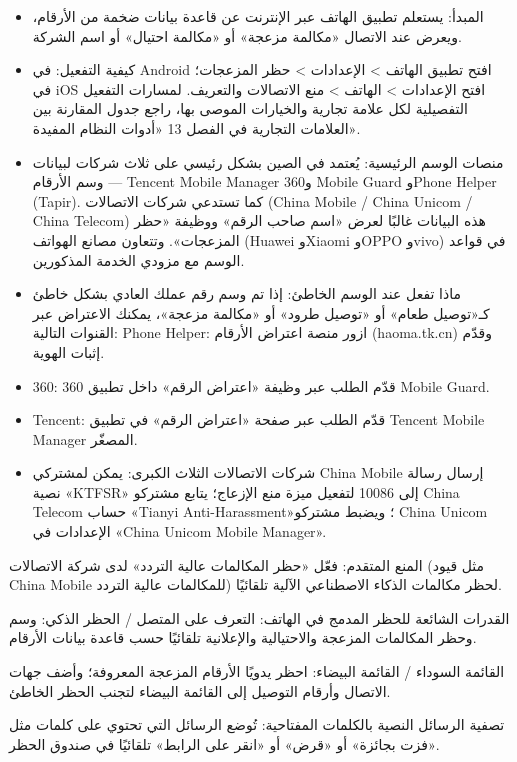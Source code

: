 
\begin{itemize}
  \item المبدأ: يستعلم تطبيق الهاتف عبر الإنترنت عن قاعدة بيانات ضخمة من الأرقام، ويعرض عند الاتصال «مكالمة مزعجة» أو «مكالمة احتيال» أو اسم الشركة.
  \item كيفية التفعيل: في Android افتح تطبيق الهاتف > الإعدادات > حظر المزعجات؛ في iOS افتح الإعدادات > الهاتف > منع الاتصالات والتعريف. لمسارات التفعيل التفصيلية لكل علامة تجارية والخيارات الموصى بها، راجع جدول المقارنة بين العلامات التجارية في الفصل 13 «أدوات النظام المفيدة».
  \item منصات الوسم الرئيسية: يُعتمد في الصين بشكل رئيسي على ثلاث شركات لبيانات وسم الأرقام — Tencent Mobile Manager و360 Mobile Guard وPhone Helper (Tapir). كما تستدعي شركات الاتصالات (China Mobile / China Unicom / China Telecom) هذه البيانات غالبًا لعرض «اسم صاحب الرقم» ووظيفة «حظر المزعجات». وتتعاون مصانع الهواتف (Huawei وXiaomi وOPPO وvivo) في قواعد الوسم مع مزودي الخدمة المذكورين.
  \item ماذا تفعل عند الوسم الخاطئ: إذا تم وسم رقم عملك العادي بشكل خاطئ كـ«توصيل طعام» أو «توصيل طرود» أو «مكالمة مزعجة»، يمكنك الاعتراض عبر القنوات التالية: Phone Helper: ازور منصة اعتراض الأرقام (haoma.tk.cn) وقدّم إثبات الهوية.
  \item 360: قدّم الطلب عبر وظيفة «اعتراض الرقم» داخل تطبيق 360 Mobile Guard.
  \item Tencent: قدّم الطلب عبر صفحة «اعتراض الرقم» في تطبيق Tencent Mobile Manager المصغّر.
  \item شركات الاتصالات الثلاث الكبرى: يمكن لمشتركي China Mobile إرسال رسالة نصية «KTFSR» إلى 10086 لتفعيل ميزة منع الإزعاج؛ يتابع مشتركو China Telecom حساب «Tianyi Anti-Harassment»؛ ويضبط مشتركو China Unicom الإعدادات في «China Unicom Mobile Manager».
\end{itemize}

المنع المتقدم: فعّل «حظر المكالمات عالية التردد» لدى شركة الاتصالات (مثل قيود China Mobile للمكالمات عالية التردد) لحظر مكالمات الذكاء الاصطناعي الآلية تلقائيًا.

القدرات الشائعة للحظر المدمج في الهاتف: التعرف على المتصل / الحظر الذكي: وسم وحظر المكالمات المزعجة والاحتيالية والإعلانية تلقائيًا حسب قاعدة بيانات الأرقام.

القائمة السوداء / القائمة البيضاء: احظر يدويًا الأرقام المزعجة المعروفة؛ وأضف جهات الاتصال وأرقام التوصيل إلى القائمة البيضاء لتجنب الحظر الخاطئ.

تصفية الرسائل النصية بالكلمات المفتاحية: تُوضع الرسائل التي تحتوي على كلمات مثل «فزت بجائزة» أو «قرض» أو «انقر على الرابط» تلقائيًا في صندوق الحظر.

